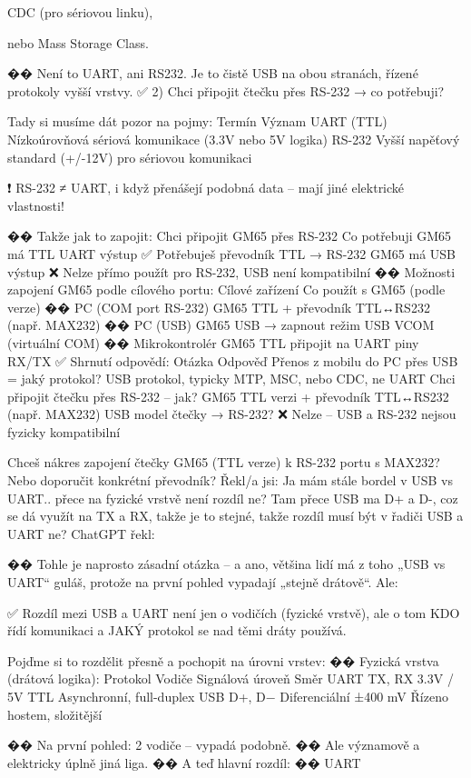         CDC (pro sériovou linku),

        nebo Mass Storage Class.

�� Není to UART, ani RS232. Je to čistě USB na obou stranách, řízené protokoly vyšší vrstvy.
✅ 2) Chci připojit čtečku přes RS-232 → co potřebuji?

Tady si musíme dát pozor na pojmy:
Termín	Význam
UART (TTL)	Nízkoúrovňová sériová komunikace (3.3V nebo 5V logika)
RS-232	Vyšší napěťový standard (+/-12V) pro sériovou komunikaci

    ❗ RS-232 ≠ UART, i když přenášejí podobná data – mají jiné elektrické vlastnosti!

�� Takže jak to zapojit:
Chci připojit GM65 přes RS-232	Co potřebuji
GM65 má TTL UART výstup	✅ Potřebuješ převodník TTL → RS-232
GM65 má USB výstup	❌ Nelze přímo použít pro RS-232, USB není kompatibilní
�� Možnosti zapojení GM65 podle cílového portu:
Cílové zařízení	Co použít s GM65 (podle verze)
��️ PC (COM port RS-232)	GM65 TTL + převodník TTL↔RS232 (např. MAX232)
��️ PC (USB)	GM65 USB → zapnout režim USB VCOM (virtuální COM)
��️ Mikrokontrolér	GM65 TTL připojit na UART piny RX/TX
✅ Shrnutí odpovědí:
Otázka	Odpověď
Přenos z mobilu do PC přes USB = jaký protokol?	USB protokol, typicky MTP, MSC, nebo CDC, ne UART
Chci připojit čtečku přes RS-232 – jak?	GM65 TTL verzi + převodník TTL↔RS232 (např. MAX232)
USB model čtečky → RS-232?	❌ Nelze – USB a RS-232 nejsou fyzicky kompatibilní

Chceš nákres zapojení čtečky GM65 (TTL verze) k RS-232 portu s MAX232? Nebo doporučit konkrétní převodník?
Řekl/a jsi:
Ja mám stále bordel v USB vs UART.. přece na fyzické vrstvě není rozdíl ne? Tam přece USB ma D+ a D-, coz se dá využít na TX a RX, takže je to stejné, takže rozdíl musí být v řadiči USB a UART ne?
ChatGPT řekl:

�� Tohle je naprosto zásadní otázka – a ano, většina lidí má z toho „USB vs UART“ guláš, protože na první pohled vypadají „stejně drátově“. Ale:

    ✅ Rozdíl mezi USB a UART není jen o vodičích (fyzické vrstvě), ale o tom KDO řídí komunikaci a JAKÝ protokol se nad těmi dráty používá.

Pojďme si to rozdělit přesně a pochopit na úrovni vrstev:
�� Fyzická vrstva (drátová logika):
Protokol	Vodiče	Signálová úroveň	Směr
UART	TX, RX	3.3V / 5V TTL	Asynchronní, full-duplex
USB	D+, D−	Diferenciální ±400 mV	Řízeno hostem, složitější

�� Na první pohled: 2 vodiče – vypadá podobně.
�� Ale významově a elektricky úplně jiná liga.
�� A teď hlavní rozdíl:
�� UART

